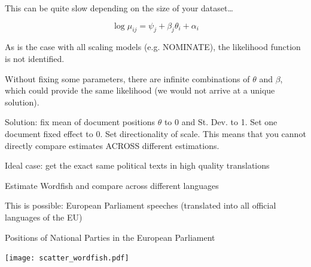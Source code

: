 \documentclass{mediumfoils}
\begin{document}
This can be quite slow depending on the size of your dataset\ldots





\[\log \mu_{ij} = \psi_{j} + \beta_{j}\theta_{i} +  \alpha_{i}\]

	As is the case with all scaling models (e.g. NOMINATE), the likelihood function is not identified.
		
	  Without fixing some parameters, there are infinite combinations of $\theta$ and $\beta$, which could provide the same likelihood (we would not arrive at a unique solution). 
    

Solution: fix  mean of document positions %
$\theta$ to 0 and St. Dev. to 1. Set one document fixed effect to 0. Set directionality of scale. This means that you cannot directly compare estimates ACROSS different estimations.








 Ideal case: get the exact same political texts in high quality translations

 Estimate Wordfish and compare across different languages

 This is possible: European Parliament speeches (translated into all official languages of the EU)





\begin{center}
Positions of National Parties in the European Parliament


\texttt{[image: scatter\_wordfish.pdf]}

\end{center}
\end{document}
